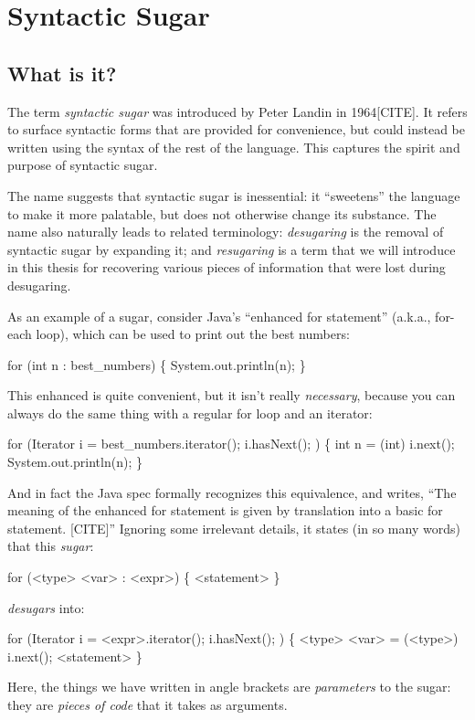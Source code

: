 \chapter{Syntactic Sugar}

\section{What is it?}

The term \emph{syntactic sugar} was introduced by Peter Landin in
1964[CITE]. It refers to surface syntactic forms that are provided for
convenience, but could instead be written using the syntax of the rest
of the language. This captures the spirit and purpose of syntactic
sugar.

The name suggests that syntactic sugar is inessential: it ``sweetens''
the language to make it more palatable, but does not otherwise change
its substance. The name also naturally leads to related terminology:
\emph{desugaring} is the removal of syntactic sugar by expanding it;
and \emph{resugaring} is a term that we will introduce in this thesis
for recovering various pieces of information that were lost during
desugaring.

As an example of a sugar, consider Java's ``enhanced for statement''
(a.k.a., for-each loop), which can be used to print out the best
numbers:
\begin{Codes}
for (int n : best_numbers) \{
  System.out.println(n);
\}
\end{Codes}
This enhanced  is quite convenient, but it isn't really
\emph{necessary}, because you can always do the same thing with a
regular for loop and an iterator:
\begin{Codes}
for (Iterator i = best_numbers.iterator(); i.hasNext(); ) \{
  int n = (int) i.next();
  System.out.println(n);
\}
\end{Codes}

And in fact the Java spec formally recognizes this equivalence, and
writes, ``The meaning of the enhanced for statement is given by
translation into a basic for statement. [CITE]'' Ignoring some
irrelevant details, it states (in so many words) that this \emph{sugar}:
\begin{Codes}
for (<type> <var> : <expr>) \{ <statement> \}
\end{Codes}
\emph{desugars} into:
\begin{Codes}
for (Iterator i = <expr>.iterator(); i.hasNext(); ) \{
  <type> <var> = (<type>) i.next();
  <statement>
\}
\end{Codes}
Here, the things we have written in angle brackets are
\emph{parameters} to the sugar: they are \emph{pieces of code} that it
takes as arguments.

